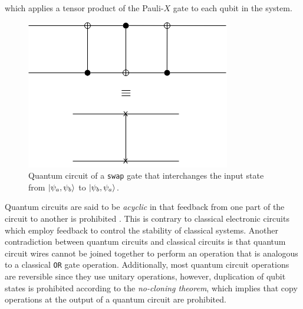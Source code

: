 which applies a tensor product of the Pauli-$X$ gate to each qubit in the system. 
\begin{figure}[!ht]
	\centering
	\includegraphics[scale=0.55]{body/ch2/figs/swap-circuit}
	\caption[Swap gate interchanges input qubits in a 2-qubit system.]{Quantum circuit of a \texttt{swap} gate that interchanges the input state from $\ket{\psi_a,\psi_b}$ to $\ket{\psi_b,\psi_a}$.}
	\label{fig:swapcircuit}
\end{figure}
Quantum circuits are said to be \textit{acyclic} in that feedback from one part of the circuit to another is prohibited \cite{Rieffel2011}. This is contrary to classical electronic circuits which employ feedback to control the stability of classical systems. Another contradiction between quantum circuits and classical circuits is that quantum circuit wires cannot be joined together to perform an operation that is analogous to a classical \texttt{OR} gate operation. Additionally, most quantum circuit operations are reversible since they use unitary operations, however, duplication of qubit states is prohibited according to the \textit{no-cloning theorem}, which implies that copy operations at the output of a quantum circuit are prohibited.  

